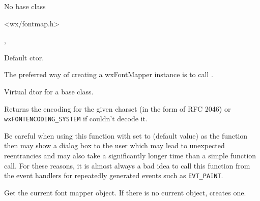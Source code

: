 
No base class


<wx/fontmap.h>




, 



\label{wxfontmapperwxfontmapper}


Default ctor.


The preferred way of creating a wxFontMapper instance is to call 
.


\label{wxfontmapperdtor}


Virtual dtor for a base class.


\label{wxfontmappercharsettoencoding}


Returns the encoding for the given charset (in the form of RFC 2046) or
\texttt{wxFONTENCODING\_SYSTEM} if couldn't decode it.

Be careful when using this function with  set to \true
(default value) as the function then may show a dialog box to the user which
may lead to unexpected reentrancies and may also take a significantly longer
time than a simple function call. For these reasons, it is almost always a bad
idea to call this function from the event handlers for repeatedly generated
events such as \texttt{EVT\_PAINT}.


\label{wxfontmapperget}


Get the current font mapper object. If there is no current object, creates
one.

